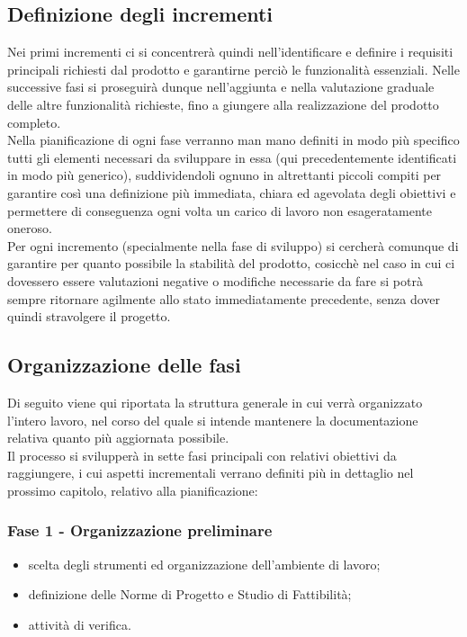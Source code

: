 \subsection{Definizione degli incrementi}
    Nei primi incrementi ci si concentrerà quindi nell'identificare e definire i requisiti principali richiesti dal prodotto e garantirne perciò le funzionalità essenziali. Nelle successive fasi si proseguirà dunque nell'aggiunta e nella valutazione graduale delle altre funzionalità richieste, fino a giungere alla realizzazione del prodotto completo. \\
    Nella pianificazione di ogni fase verranno man mano definiti in modo più specifico tutti gli elementi necessari da sviluppare in essa (qui precedentemente identificati in modo più generico), suddividendoli ognuno in altrettanti piccoli compiti per garantire così una definizione più immediata, chiara ed agevolata degli obiettivi e permettere di conseguenza ogni volta un carico di lavoro non esageratamente oneroso. \\
    Per ogni incremento (specialmente nella fase di sviluppo) si cercherà comunque di garantire per quanto possibile la stabilità del prodotto, cosicchè nel caso in cui ci dovessero essere valutazioni negative o modifiche necessarie da fare si potrà sempre ritornare agilmente allo stato immediatamente precedente, senza dover quindi stravolgere il progetto.

\subsection{Organizzazione delle fasi}
    Di seguito viene qui riportata la struttura generale in cui verrà organizzato l'intero lavoro, nel corso del quale si intende mantenere la documentazione relativa quanto più aggiornata possibile. \\
    Il processo si svilupperà in sette fasi principali con relativi obiettivi da raggiungere, i cui aspetti incrementali verrano definiti più in dettaglio nel prossimo capitolo, relativo alla pianificazione:

    \subsubsection{Fase 1 - Organizzazione preliminare}
        \begin{itemize}
            \item scelta degli strumenti ed organizzazione dell'ambiente di lavoro;
            \item definizione delle Norme di Progetto e Studio di Fattibilità;
            \item attività di verifica.
        \end{itemize}
            
